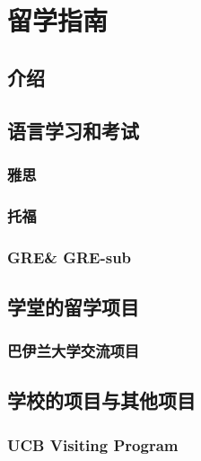 \chapter{留学指南}

\section{介绍}


\section{语言学习和考试}

\subsection*{雅思}

\subsection*{托福}

\subsection*{GRE\& GRE-sub}

\section{学堂的留学项目}

\subsection*{巴伊兰大学交流项目}

\section{学校的项目与其他项目}

\subsection*{UCB Visiting Program}
